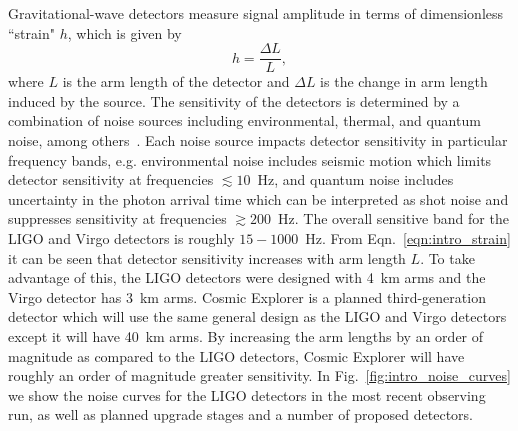 Gravitational-wave detectors measure signal amplitude in terms of dimensionless ``strain" $h$, which is given by
\begin{equation}\label{eqn:intro_strain}
    h = \frac{\Delta L}{L} ,
\end{equation}
where $L$ is the arm length of the detector and $\Delta L$ is the change in arm length induced by the source. The sensitivity of the detectors is determined by a combination of noise sources including environmental, thermal, and quantum noise, among others~\cite{Martynov:2016fzi}. Each noise source impacts detector sensitivity in particular frequency bands, e.g. environmental noise includes seismic motion which limits detector sensitivity at frequencies $\lesssim 10$~Hz, and quantum noise includes uncertainty in the photon arrival time which can be interpreted as shot noise and suppresses sensitivity at frequencies $\gtrsim 200$~Hz. The overall sensitive band for the LIGO and Virgo detectors is roughly $15-1000$~Hz. From Eqn.~\ref{eqn:intro_strain} it can be seen that detector sensitivity increases with arm length $L$. To take advantage of this, the LIGO detectors were designed with 4~km arms and the Virgo detector has 3~km arms. Cosmic Explorer is a planned third-generation detector which will use the same general design as the LIGO and Virgo detectors except it will have 40~km arms. By increasing the arm lengths by an order of magnitude as compared to the LIGO detectors, Cosmic Explorer will have roughly an order of magnitude greater sensitivity. In Fig.~\ref{fig:intro_noise_curves} we show the noise curves for the LIGO detectors in the most recent observing run, as well as planned upgrade stages and a number of proposed detectors.

